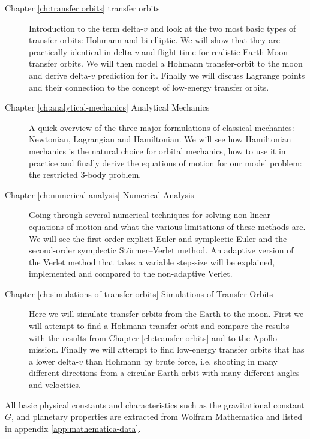 \begin{description}
    \item[Chapter \ref{ch:transfer orbits} transfer orbits] Introduction to the term delta-$v$ and look at the two most basic types of transfer orbits: Hohmann and bi-elliptic. We will show that they are practically identical in delta-$v$ and flight time for realistic Earth-Moon transfer orbits. We will then model a Hohmann transfer-orbit to the moon and derive delta-$v$ prediction for it. Finally we will discuss Lagrange points and their connection to the concept of low-energy transfer orbits.
    \item[Chapter \ref{ch:analytical-mechanics} Analytical Mechanics] A quick overview of the three major formulations of classical mechanics: Newtonian, Lagrangian and Hamiltonian. We will see how Hamiltonian mechanics is the natural choice for orbital mechanics, how to use it in practice and finally derive the equations of motion for our model problem: the restricted 3-body problem.
    \item[Chapter \ref{ch:numerical-analysis} Numerical Analysis] Going through several numerical techniques for solving non-linear equations of motion and what the various limitations of these methods are. We will see the first-order explicit Euler and symplectic Euler and the second-order symplectic Störmer–Verlet method. An adaptive version of the Verlet method that takes a variable step-size will be explained, implemented and compared to the non-adaptive Verlet.
    \item[Chapter \ref{ch:simulations-of-transfer orbits} Simulations of Transfer Orbits] Here we will simulate transfer orbits from the Earth to the moon. First we will attempt to find a Hohmann transfer-orbit and compare the results with the results from Chapter \ref{ch:transfer orbits} and to the Apollo mission. Finally we will attempt to find low-energy transfer orbits that has a lower delta-$v$ than Hohmann by brute force, i.e. shooting in many different directions from a circular Earth orbit with many different angles and velocities.
\end{description}

All basic physical constants and characteristics such as the gravitational constant $G$, and planetary properties are extracted from Wolfram Mathematica \cite{ma} and listed in appendix \ref{app:mathematica-data}.
